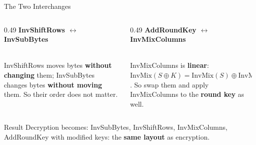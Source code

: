 \documentclass[aspectratio=169,11pt,xcolor={table}]{beamer}
\begin{document}
\begin{frame}{The Two Interchanges}
  \begin{columns}[T]
    \begin{column}{0.49\textwidth}
      \centering\textbf{\textcolor{grape}{InvShiftRows $\leftrightarrow$ InvSubBytes}}\\[2mm]
      \\[2mm]
      {\small InvShiftRows moves bytes \textbf{without changing} them; InvSubBytes changes bytes \textbf{without moving} them. So their order does not matter.}
    \end{column}
    \begin{column}{0.49\textwidth}
      \centering\textbf{\textcolor{ocean}{AddRoundKey $\leftrightarrow$ InvMixColumns}}\\[2mm]
      \\[2mm]
      {\small InvMixColumns is \textbf{linear}: $\mathrm{InvMix}(S \oplus K) = \mathrm{InvMix}(S) \oplus \mathrm{InvMix}(K)$. So swap them and apply InvMixColumns to the \textbf{round key} as well.}
    \end{column}
  \end{columns}
  \vspace{4mm}
  \begin{block}{Result}
    \small Decryption becomes: InvSubBytes, InvShiftRows, InvMixColumns, AddRoundKey with modified keys: the \textbf{same layout} as encryption.
  \end{block}
\end{frame}
\end{document}
